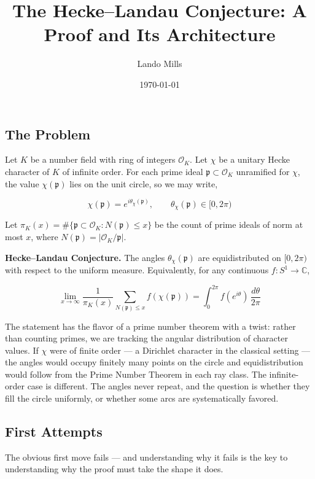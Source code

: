 \documentclass[12pt,a4paper]{article}
\begin{document}
\title{The Hecke--Landau Conjecture: A Proof and Its Architecture}
\author{Lando Mills}
\date{\today}

\maketitle

\subsection{The Problem}

Let $K$ be a number field with ring of integers $\mathcal{O}_K$. Let $\chi$ be a unitary Hecke character of $K$ of infinite order. For each prime ideal $\mathfrak{p} \subset \mathcal{O}_K$ unramified for $\chi$, the value $\chi(\mathfrak{p})$ lies on the unit circle, so we may write,

\[
\chi(\mathfrak{p}) = e^{i\theta_{\chi}(\mathfrak{p})}, \qquad \theta_{\chi}(\mathfrak{p}) \in [0, 2\pi)
\]

Let $\pi_K(x) = \#\{\mathfrak{p} \subset \mathcal{O}_K : N(\mathfrak{p}) \leq x\}$ be the count of prime ideals of norm at most $x$, where $N(\mathfrak{p}) = |\mathcal{O}_K/\mathfrak{p}|$.

\textbf{Hecke--Landau Conjecture.} The angles $\theta_{\chi}(\mathfrak{p})$ are equidistributed on $[0,2\pi)$ with respect to the uniform measure. Equivalently, for any continuous $f: S^1 \to \mathbb{C}$,

\[
\lim_{x \to \infty} \frac{1}{\pi_K(x)} \sum_{N(\mathfrak{p}) \leq x} f(\chi(\mathfrak{p})) = \int_0^{2\pi} f(e^{i\theta}) \, \frac{d\theta}{2\pi}
\]

The statement has the flavor of a prime number theorem with a twist: rather than counting primes, we are tracking the angular distribution of character values. If $\chi$ were of finite order --- a Dirichlet character in the classical setting --- the angles would occupy finitely many points on the circle and equidistribution would follow from the Prime Number Theorem in each ray class. The infinite-order case is different. The angles never repeat, and the question is whether they fill the circle uniformly, or whether some arcs are systematically favored.

\subsection{First Attempts}

The obvious first move fails --- and understanding why it fails is the key to understanding why the proof must take the shape it does.
\end{document}
